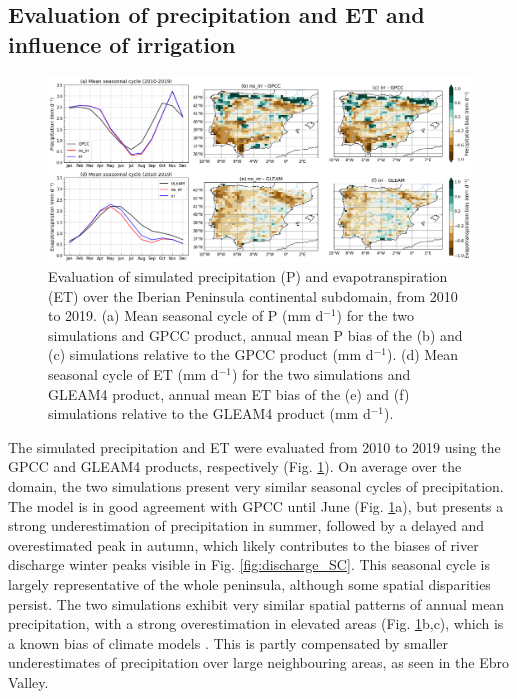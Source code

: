 
\subsection{Evaluation of precipitation and ET and influence of irrigation}

\begin{figure}[htbp]
    \centering
    \includegraphics[width=\textwidth]{images/chap4/article/f06.png}
    \caption{Evaluation of simulated precipitation (P) and evapotranspiration (ET) over the Iberian Peninsula continental subdomain, from 2010 to 2019. 
    (a) Mean seasonal cycle of P (mm d$^{-1}$) for the two simulations and GPCC product, annual mean P bias of the (b) \noirr and (c) \irr simulations relative to the GPCC product (mm d$^{-1}$).
    (d) Mean seasonal cycle of ET (mm d$^{-1}$) for the two simulations and GLEAM4 product, annual mean ET bias of the (e) \noirr and (f) \irr simulations relative to the GLEAM4 product (mm d$^{-1}$).}
    \label{fig:sim_eval_ET_P}
\end{figure}

The simulated precipitation and ET were evaluated from 2010 to 2019 using the GPCC and GLEAM4 products, respectively (Fig. \ref{fig:sim_eval_ET_P}).
On average over the domain, the two simulations present very similar seasonal cycles of precipitation. The model is in good agreement with GPCC until June (Fig. \ref{fig:sim_eval_ET_P}a), but presents a strong underestimation of precipitation in summer, followed by a delayed and overestimated peak in autumn, which likely contributes to the biases of river discharge winter peaks visible in Fig. \ref{fig:discharge_SC}. 
This seasonal cycle is largely representative of the whole peninsula, although some spatial disparities persist. The two simulations exhibit very similar spatial patterns of annual mean precipitation, with a strong overestimation in elevated areas (Fig. \ref{fig:sim_eval_ET_P}b,c), which is a known bias of climate models \citep{arjdal_modeling_2024, adhikari_evaluation_2024}.
This is partly compensated by smaller underestimates of precipitation over large neighbouring areas, as seen in the Ebro Valley.

